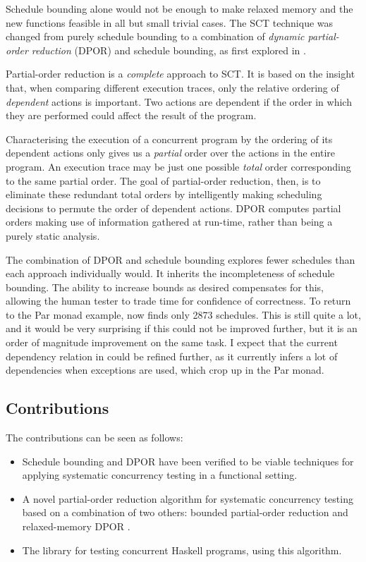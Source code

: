 Schedule bounding alone would not be enough to make relaxed memory and
the new functions feasible in all but small trivial cases. The SCT
technique was changed from purely schedule bounding to a combination
of \emph{dynamic partial-order reduction} (DPOR) and schedule
bounding, as first explored in \citep{bpor}.

Partial-order reduction \citep{por} is a \emph{complete} approach to
SCT. It is based on the insight that, when comparing different
execution traces, only the relative ordering of \emph{dependent}
actions is important. Two actions are dependent if the order in which
they are performed could affect the result of the program.

Characterising the execution of a concurrent program by the ordering
of its dependent actions only gives us a \emph{partial} order over the
actions in the entire program. An execution trace may be just one
possible \emph{total} order corresponding to the same partial
order. The goal of partial-order reduction, then, is to eliminate
these redundant total orders by intelligently making scheduling
decisions to permute the order of dependent actions. DPOR \citep{dpor}
computes partial orders making use of information gathered at
run-time, rather than being a purely static analysis.

The combination of DPOR and schedule bounding explores fewer schedules
than each approach individually would. It inherits the incompleteness
of schedule bounding. The ability to increase bounds as desired
compensates for this, allowing the human tester to trade time for
confidence of correctness. To return to the Par monad example,
\dejafu{} now finds only 2873 schedules. This is still quite a lot,
and it would be very surprising if this could not be improved further,
but it is an order of magnitude improvement on the same task. I expect
that the current dependency relation in \dejafu{} could be refined
further, as it currently infers a lot of dependencies when exceptions
are used, which crop up in the Par monad.

\subsection{Contributions}
\label{sec:progress-dejafu-contribs}

The contributions can be seen as follows:

\begin{itemize}
\item Schedule bounding and DPOR have been verified to be viable
  techniques for applying systematic concurrency testing in a
  functional setting.

\item A novel partial-order reduction algorithm for systematic
  concurrency testing based on a combination of two others: bounded
  partial-order reduction \citep{bpor} and relaxed-memory DPOR
  \citep{rdpor}.

\item The \dejafu{} library for testing concurrent Haskell programs,
  using this algorithm.
\end{itemize}
